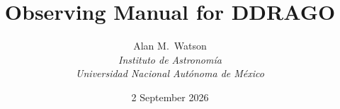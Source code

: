 \title{
    \bfseries Observing Manual for DDRAGO
}

\author{
    Alan M.\ Watson\\[\medskipamount]
    \itshape Instituto de Astronomía\\
    \itshape Universidad Nacional Autónoma de México
}

\date{2 September 2026}

\maketitle

\tableofcontents